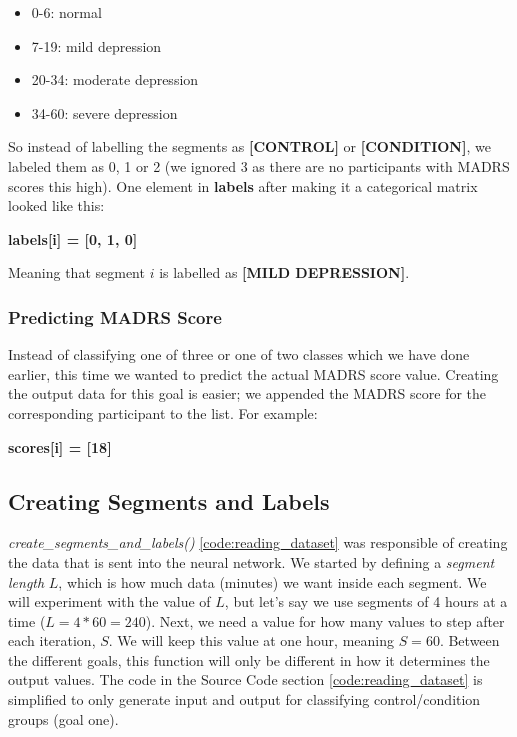 \begin{itemize}
  \item 0-6: normal
  \item 7-19: mild depression
  \item 20-34: moderate depression
  \item 34-60: severe depression
\end{itemize}

So instead of labelling the segments as \textbf{[CONTROL]} or \textbf{[CONDITION]}, we labeled them as 0, 1 or 2 (we ignored 3 as there are no participants with MADRS scores this high). One element in \textbf{labels} after making it a categorical matrix looked like this:

\textbf{labels[i] = [0, 1, 0]}

\noindent Meaning that segment $i$ is labelled as \textbf{[MILD DEPRESSION]}.

\subsubsection{Predicting MADRS Score}

Instead of classifying one of three or one of two classes which we have done earlier, this time we wanted to predict the actual MADRS score value. Creating the output data for this goal is easier; we appended the MADRS score for the corresponding participant to the list. For example:

\textbf{scores[i] = [18]}

\subsection{Creating Segments and Labels}
\textit{create\_segments\_and\_labels()} \ref{code:reading_dataset} was responsible of creating the data that is sent into the neural network. We started by defining a \textit{segment length} $L$, which is how much data (minutes) we want inside each segment. We will experiment with the value of $L$, but let's say we use segments of 4 hours at a time ($L=4*60=240$). Next, we need a value for how many values to step after each iteration, $S$. We will keep this value at one hour, meaning $S=60$. Between the different goals, this function will only be different in how it determines the output values. The code in the Source Code section \ref{code:reading_dataset} is simplified to only generate input and output for classifying control/condition groups (goal one).

